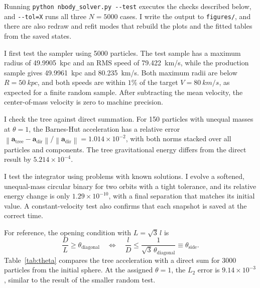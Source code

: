 \documentclass[12pt,a4paper]{article}
\newcommand{\norm}[1]{\left\lVert#1\right\rVert}
\begin{document}
Running \texttt{python nbody\_solver.py -{}-test} executes the checks described
below, and \texttt{-{}-tol=X} runs all three $N=5000$ cases. I write the output
to \texttt{figures/}, and there are also redraw and refit modes that rebuild the
plots and the fitted tables from the saved states.

I first test the sampler using 5000 particles. The test sample has a maximum
radius of \SI{49.9905}{kpc} and an RMS speed of \SI{79.422}{km/s}, while the
production sample gives \SI{49.9961}{kpc} and \SI{80.235}{km/s}. Both maximum
radii are below $R=\SI{50}{kpc}$, and both speeds are within $1\%$ of the target
$V=\SI{80}{km/s}$, as expected for a finite random sample. After subtracting
the mean velocity, the center-of-mass velocity is zero to machine precision.

I check the tree against direct summation. For 150 particles with
unequal masses at $\theta=1$, the Barnes-Hut acceleration has a relative error
$\norm{\mathbf{a}_{\mathrm{tree}}-\mathbf{a}_{\mathrm{dir}}}/
    \norm{\mathbf{a}_{\mathrm{dir}}}=1.014\times10^{-2}$, with both norms stacked
over all particles and components. The tree gravitational energy differs from
the direct result by $5.214\times10^{-4}$.

I test the integrator using problems with known solutions. I evolve a softened,
unequal-mass circular binary for two orbits with a tight tolerance, and its
relative energy change is only $1.29\times10^{-10}$, with a final separation
that matches its initial value. A constant-velocity test also confirms that
each snapshot is saved at the correct time.

For reference, the opening condition with $L=\sqrt3\,l$ is
\begin{equation}\label{eq:thetaconv}
    \frac{D}{L}\geq\theta_{\mathrm{diagonal}}
    \quad\Longleftrightarrow\quad
    \frac{l}{D}\leq
    \frac{1}{\sqrt3\,\theta_{\mathrm{diagonal}}}
    \equiv\theta_{\mathrm{side}}.
\end{equation}
Table~\ref{tab:theta} compares the tree acceleration with a direct sum for
3000 particles from the initial sphere. At the assigned $\theta=1$, the $L_2$
error is $9.14\times10^{-3}$, similar to the result of the smaller random test.

\begin{table}[htbp]
    \centering
    \caption{Barnes-Hut acceleration error against direct summation for the
        initial uniform sphere, $N=3000$.}
    \label{tab:theta}
    
\end{table}
\end{document}
